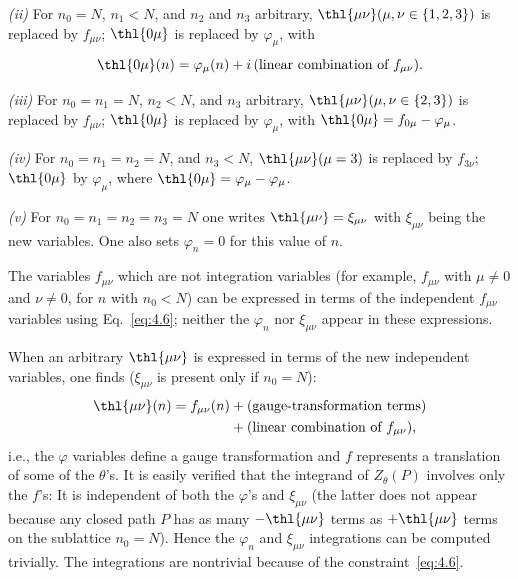 \emph{(ii)}  For $n_{0}=N$, $n_{1}<N$, and $n_{2}$ and $n_{3}$ arbitrary,
$\thl{\mu\nu}(\mu,\nu\in\{1,2,3\})$ is replaced by $f_{\mu\nu}$;
$\thl{0\mu}$ is replaced by $\varphi_{\mu}$, with
\begin{equation}
\thl{0\mu}(n) = \varphi_{\mu}(n) + i\,\text{(linear combination of $f_{\mu\nu}$)}.
\label{eq:5.4}
\end{equation}

\emph{(iii)}  For $n_{0}=n_{1}=N$, $n_{2}<N$, and $n_{3}$ arbitrary,
$\thl{\mu\nu}(\mu,\nu\in\{2,3\})$ is replaced by $f_{\mu\nu}$;
$\thl{0\mu}$ is replaced by $\varphi_{\mu}$, with
$\thl{0\mu}=f_{0\mu}-\varphi_{\mu}$.

\emph{(iv)}  For $n_{0}=n_{1}=n_{2}=N$, and $n_{3}<N$,
$\thl{\mu\nu}(\mu=3)$ is replaced by $f_{3\nu}$; $\thl{0\mu}$ by
$\varphi_{\mu}$, where $\thl{0\mu}=\varphi_{\mu}-\varphi_{\mu}$.

\emph{(v)}  For $n_{0}=n_{1}=n_{2}=n_{3}=N$ one writes
$\thl{\mu\nu}=\xi_{\mu\nu}$ with $\xi_{\mu\nu}$ being the new variables.
One also sets $\varphi_{n}=0$ for this value of $n$.

The variables $f_{\mu\nu}$ which are not integration variables (for
example, $f_{\mu\nu}$ with $\mu\ne0$ and $\nu\ne0$, for $n$ with
$n_{0}<N$) can be expressed in terms of the independent $f_{\mu\nu}$
variables using Eq.~\eqref{eq:4.6}; neither the $\varphi_{n}$ nor
$\xi_{\mu\nu}$ appear in these expressions.

When an arbitrary $\thl{\mu\nu}$ is expressed in terms of the new
independent variables, one finds ($\xi_{\mu\nu}$ is present only if
$n_{0}=N$):
\begin{equation}
\begin{split}
\thl{\mu\nu}(n) = f_{\mu\nu}(n) &+ \text{(gauge-transformation terms)}\\
 &+ \text{(linear combination of $f_{\mu\nu}$)},
\end{split}
\label{eq:5.5}
\end{equation}
i.e., the $\varphi$ variables define a gauge transformation and $f$
represents a translation of some of the $\theta$'s.  It is easily
verified that the integrand of $Z_{\theta}(P)$ involves only the $f$'s:
It is independent of both the $\varphi$'s and $\xi_{\mu\nu}$ (the latter
does not appear because any closed path $P$ has as many
$-\thl{\mu\nu}$ terms as $+\thl{\mu\nu}$ terms on the sublattice
$n_{0}=N$).  Hence the $\varphi_{n}$ and $\xi_{\mu\nu}$ integrations can
be computed trivially.  The integrations are nontrivial because of the
constraint~\eqref{eq:4.6}.

